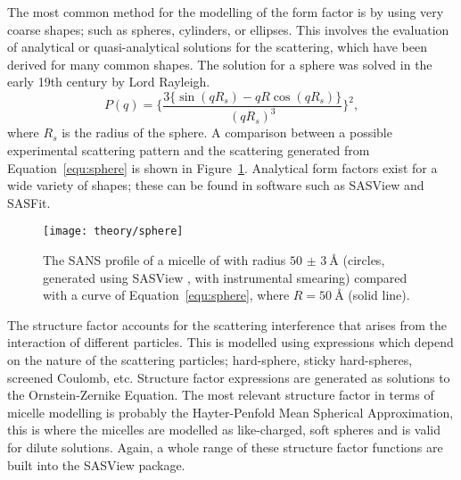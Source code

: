 The most common method for the modelling of the form factor is by using very coarse shapes; such as spheres, cylinders, or ellipses.
This involves the evaluation of analytical or quasi-analytical solutions for the scattering, which have been derived for many common shapes.
The solution for a sphere was solved in the early 19th century by Lord Rayleigh.
%
\begin{equation}
    P(q) = \Bigg\{\frac{3\big\{\sin(qR_s) - qR\cos(qR_s)\big\}}{(qR_s)^3}\Bigg\}^2,
    \label{equ:sphere}
\end{equation}
%
where $R_s$ is the radius of the sphere.
A comparison between a possible experimental scattering pattern and the scattering generated from Equation~\ref{equ:sphere} is shown in Figure~\ref{fig:sphere}.
Analytical form factors exist for a wide variety of shapes; these can be found in software such as SASView and SASFit.
%
\begin{figure}[t]
    \centering
    \texttt{[image: theory/sphere]}
    \caption{The SANS profile of a micelle of  with radius $\SI{50(3)}{\angstrom}$ (circles, generated using SASView \cite{noauthor_sasview_nodate}, with instrumental smearing) compared with a curve of Equation~\protect\ref{equ:sphere}, where $R = \SI{50}{\angstrom}$ (solid line).}
    \label{fig:sphere}
\end{figure}
%

The structure factor accounts for the scattering interference that arises from the interaction of different particles.
This is modelled using expressions which depend on the nature of the scattering particles; hard-sphere, sticky hard-spheres, screened Coulomb, etc.
Structure factor expressions are generated as solutions to the Ornstein-Zernike Equation.
The most relevant structure factor in terms of micelle modelling is probably the Hayter-Penfold Mean Spherical Approximation,  this is where the micelles are modelled as like-charged, soft spheres and is valid for dilute solutions.
Again, a whole range of these structure factor functions are built into the SASView package.

